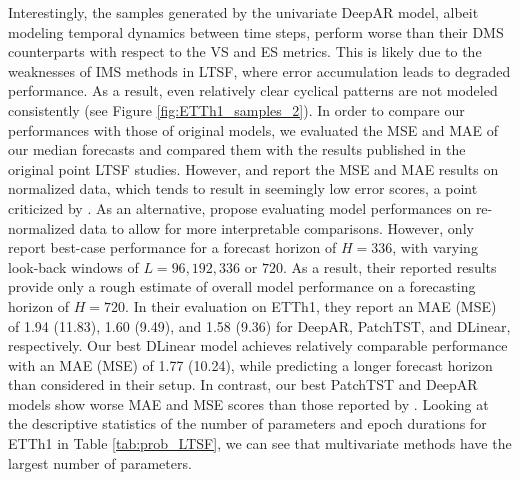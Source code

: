 \documentclass[a4paper,oneside,bibliography=totoc]{scrbook}
\begin{document}
Interestingly, the samples generated by the univariate DeepAR model, albeit modeling temporal dynamics between time steps, perform worse than their DMS counterparts with respect to the VS and ES metrics. 
This is likely due to the weaknesses of IMS methods in LTSF, where error accumulation leads to degraded performance. As a result, even relatively clear cyclical patterns are not modeled consistently (see Figure \ref{fig:ETTh1_samples_2}).
In order to compare our performances with those of original models, we evaluated the MSE and MAE of our median forecasts and compared them with the results published in the original point LTSF studies. 
However, \citet{nie_time_2022} and \citet{zeng_are_2023} report the MSE and MAE results on normalized data, which tends to result in seemingly low error scores, a point criticized by \citet{shao_exploring_2025}. 
As an alternative, \citet{shao_exploring_2025} propose evaluating model performances on re-normalized data to allow for more interpretable comparisons.
However, \citet{shao_exploring_2025} only report best-case performance for a forecast horizon of $H = 336$, with varying look-back windows of $L = 96, 192, 336$ or $720$. 
As a result, their reported results provide only a rough estimate of overall model performance on a forecasting horizon of $H = 720$.
In their evaluation on ETTh1, they report an MAE (MSE) of 1.94 (11.83), 1.60 (9.49), and 1.58 (9.36) for DeepAR, PatchTST, and DLinear, respectively.
Our best DLinear model achieves relatively comparable performance with an MAE (MSE) of 1.77 (10.24), while predicting a longer forecast horizon than considered in their setup. In contrast, our best PatchTST and DeepAR models show worse MAE and MSE scores than those reported by \citet{shao_exploring_2025}.
Looking at the descriptive statistics of the number of parameters and epoch durations for ETTh1 in Table \ref{tab:prob_LTSF}, we can see that multivariate methods have the largest number of parameters. 
\end{document}
